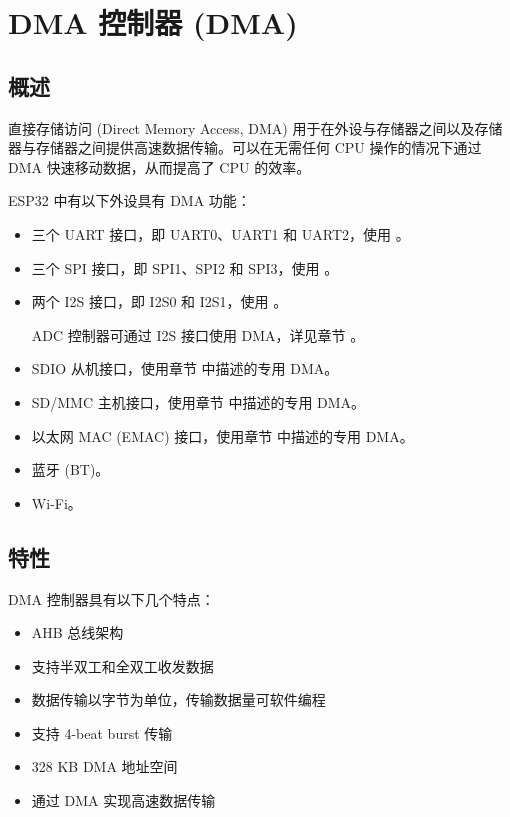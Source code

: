 \documentclass[main\_\_CN.tex]{subfiles}
\begin{document}
\hypertarget{dma}{}
\chapter{DMA 控制器 (DMA)}\label{mod:dma}

\section{概述}

直接存储访问 (Direct Memory Access, DMA) 用于在外设与存储器之间以及存储器与存储器之间提供高速数据传输。可以在无需任何 CPU 操作的情况下通过 DMA 快速移动数据，从而提高了 CPU 的效率。

ESP32 中有以下外设具有 DMA 功能：
\begin{itemize}
    \item 三个 UART 接口，即 UART0、UART1 和 UART2，使用 。
    \item 三个 SPI 接口，即 SPI1、SPI2 和 SPI3，使用 。
    \item 两个 I2S 接口，即 I2S0 和 I2S1，使用 。
        \begin{tiplisting}
            ADC 控制器可通过 I2S 接口使用 DMA，详见章节 。
        \end{tiplisting}
    \item SDIO 从机接口，使用章节  中描述的专用 DMA。
    \item SD/MMC 主机接口，使用章节  中描述的专用 DMA。
    \item 以太网 MAC (EMAC) 接口，使用章节  中描述的专用 DMA。
    \item 蓝牙 (BT)。
    \item Wi-Fi。
\end{itemize}


\section{特性}

DMA 控制器具有以下几个特点：

\begin{itemize}
    \item AHB 总线架构
    \item 支持半双工和全双工收发数据
    \item 数据传输以字节为单位，传输数据量可软件编程
    \item 支持 4-beat burst 传输
    \item 328 KB DMA 地址空间
    \item 通过 DMA 实现高速数据传输
\end{itemize}
\end{document}

